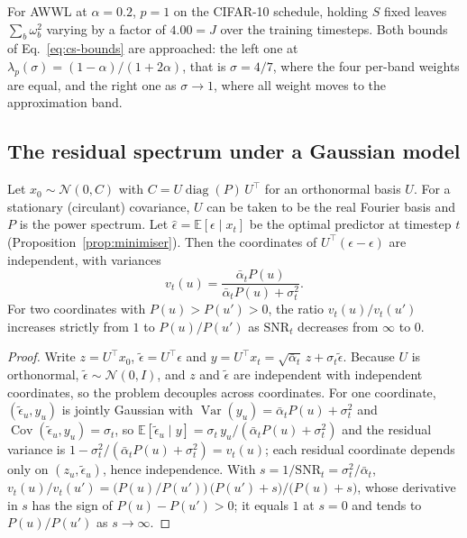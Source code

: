 For AWWL at $\alpha = 0.2$, $p = 1$ on the CIFAR-10 schedule, holding $S$
fixed leaves $\sum_b \omega_b^2$ varying by a factor of $4.00 = J$ over the
training timesteps. Both bounds of Eq.~\eqref{eq:cs-bounds} are approached:
the left one at $\lambda_p(\sigma) = (1-\alpha)/(1+2\alpha)$, that is
$\sigma = 4/7$, where the four per-band weights are equal, and the right one as
$\sigma \to 1$, where all weight moves to the approximation band.

\subsection{The residual spectrum under a Gaussian model}
\label{app:residual}

\begin{proposition}
\label{prop:residual}
Let $x_0 \sim \mathcal{N}(0, C)$ with $C = U \operatorname{diag}(P)\, U^\top$ for
an orthonormal basis $U$. For a stationary (circulant) covariance, $U$ can be
taken to be the real Fourier basis and $P$ is the power spectrum. Let
$\hat\epsilon = \mathbb{E}[\epsilon \mid x_t]$ be the optimal predictor at
timestep $t$ (Proposition~\ref{prop:minimiser}). Then the coordinates of
$U^\top(\hat\epsilon - \epsilon)$ are independent, with variances
\begin{equation}
  v_t(u) = \frac{\bar\alpha_t P(u)}{\bar\alpha_t P(u) + \sigma_t^2} .
  \label{eq:gaussian-residual}
\end{equation}
For two coordinates with $P(u) > P(u') > 0$, the ratio $v_t(u)/v_t(u')$
increases strictly from $1$ to $P(u)/P(u')$ as $\mathrm{SNR}_t$ decreases from
$\infty$ to $0$.
\end{proposition}

\begin{proof}
Write $z = U^\top x_0$, $\tilde\epsilon = U^\top \epsilon$ and
$y = U^\top x_t = \sqrt{\bar\alpha_t}\, z + \sigma_t \tilde\epsilon$. Because $U$ is
orthonormal, $\tilde\epsilon \sim \mathcal{N}(0, I)$, and $z$ and $\tilde\epsilon$ are independent with
independent coordinates, so the problem decouples across coordinates. For one
coordinate, $(\tilde\epsilon_u, y_u)$ is jointly Gaussian with
$\operatorname{Var}(y_u) = \bar\alpha_t P(u) + \sigma_t^2$ and
$\operatorname{Cov}(\tilde\epsilon_u, y_u) = \sigma_t$, so
$\mathbb{E}[\tilde\epsilon_u \mid y] = \sigma_t\, y_u/(\bar\alpha_t P(u) + \sigma_t^2)$ and
the residual variance is
$1 - \sigma_t^2/(\bar\alpha_t P(u) + \sigma_t^2) = v_t(u)$; each residual
coordinate depends only on $(z_u, \tilde\epsilon_u)$, hence independence. With
$s = 1/\mathrm{SNR}_t = \sigma_t^2/\bar\alpha_t$,
$v_t(u)/v_t(u') = \big(P(u)/P(u')\big)\,\big(P(u') + s\big)/\big(P(u) + s\big)$,
whose derivative in $s$ has the sign of $P(u) - P(u') > 0$; it equals $1$ at
$s = 0$ and tends to $P(u)/P(u')$ as $s \to \infty$.
\end{proof}

